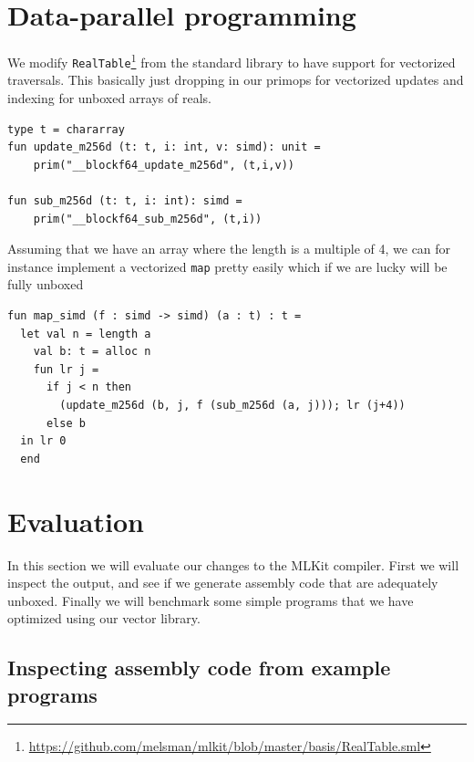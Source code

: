 \documentclass{article}
\begin{document}
\section{Data-parallel programming}

We modify \texttt{RealTable}\footnote{\url{https://github.com/melsman/mlkit/blob/master/basis/RealTable.sml}} from the standard library to have support for vectorized traversals. This basically just dropping in our primops for vectorized updates and indexing for unboxed arrays of reals.
\begin{lstlisting}[frame=single]
type t = chararray
fun update_m256d (t: t, i: int, v: simd): unit =
    prim("__blockf64_update_m256d", (t,i,v))

fun sub_m256d (t: t, i: int): simd =
    prim("__blockf64_sub_m256d", (t,i))
\end{lstlisting}

Assuming that we have an array where the length is a multiple of 4, we can for instance implement a vectorized \texttt{map} pretty easily which if we are lucky will be fully unboxed
\begin{lstlisting}[frame=single]
fun map_simd (f : simd -> simd) (a : t) : t =
  let val n = length a
    val b: t = alloc n
	fun lr j =
      if j < n then
        (update_m256d (b, j, f (sub_m256d (a, j))); lr (j+4))
      else b
  in lr 0
  end
\end{lstlisting}

\section{Evaluation}
In this section we will evaluate our changes to the MLKit compiler. First we will inspect the output, and see if we generate assembly code that are adequately unboxed. Finally we will benchmark some simple programs that we have optimized using our vector library.

\subsection{Inspecting assembly code from example programs}
\end{document}
